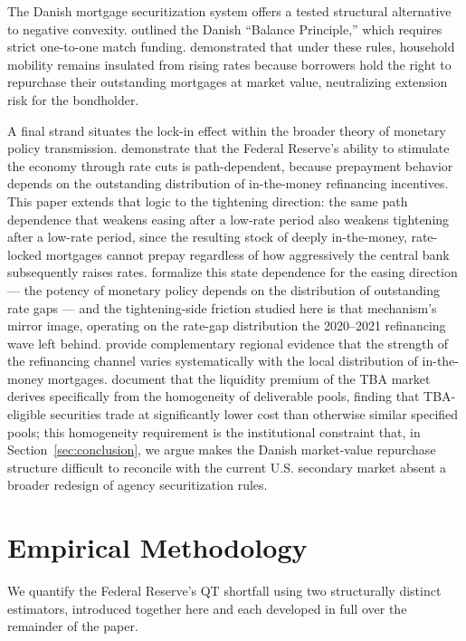 \documentclass[12pt]{article}
\begin{document}
The Danish mortgage securitization system offers a tested structural alternative to negative convexity. \citet{berg2018} outlined the Danish ``Balance Principle,'' which requires strict one-to-one match funding. \citet{berger2026} demonstrated that under these rules, household mobility remains insulated from rising rates because borrowers hold the right to repurchase their outstanding mortgages at market value, neutralizing extension risk for the bondholder.

A final strand situates the lock-in effect within the broader theory of monetary policy transmission. \citet{berger2021} demonstrate that the Federal Reserve's ability to stimulate the economy through rate cuts is path-dependent, because prepayment behavior depends on the outstanding distribution of in-the-money refinancing incentives. This paper extends that logic to the tightening direction: the same path dependence that weakens easing after a low-rate period also weakens tightening after a low-rate period, since the resulting stock of deeply in-the-money, rate-locked mortgages cannot prepay regardless of how aggressively the central bank subsequently raises rates. \citet{eichenbaum2022} formalize this state dependence for the easing direction --- the potency of monetary policy depends on the distribution of outstanding rate gaps --- and the tightening-side friction studied here is that mechanism's mirror image, operating on the rate-gap distribution the 2020--2021 refinancing wave left behind. \citet{beraja2019} provide complementary regional evidence that the strength of the refinancing channel varies systematically with the local distribution of in-the-money mortgages. \citet{vickery2013} document that the liquidity premium of the TBA market derives specifically from the homogeneity of deliverable pools, finding that TBA-eligible securities trade at significantly lower cost than otherwise similar specified pools; this homogeneity requirement is the institutional constraint that, in Section~\ref{sec:conclusion}, we argue makes the Danish market-value repurchase structure difficult to reconcile with the current U.S. secondary market absent a broader redesign of agency securitization rules.

\section{Empirical Methodology}\label{sec:method}

We quantify the Federal Reserve's QT shortfall using two structurally distinct estimators, introduced together here and each developed in full over the remainder of the paper.
\end{document}
